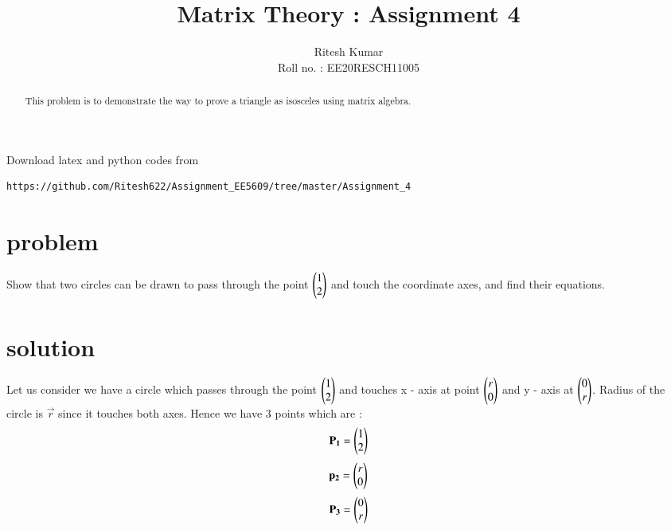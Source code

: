 \documentclass[journal,12pt,twocolumn]{IEEEtran}
\begin{document}
     \def\rightbox#1{\makebox[0in][r]{#1}}
     \def\centbox#1{\makebox[0in]{#1}}
     \def\topbox#1{\raisebox{-\baselineskip}[0in][0in]{#1}}
     \def\midbox#1{\raisebox{-0.5\baselineskip}[0in][0in]{#1}}
\vspace{3cm}
\title{ Matrix Theory : Assignment 4 }
\author{Ritesh Kumar \\ Roll no. : EE20RESCH11005 }
\maketitle
\newpage
\bigskip
\renewcommand{\thefigure}{\theenumi}
\renewcommand{\thetable}{\theenumi}
\begin{abstract}
This problem is to demonstrate the way to prove a triangle as isosceles using matrix algebra.
\end{abstract}
Download latex and python codes from 
\begin{lstlisting}
https://github.com/Ritesh622/Assignment_EE5609/tree/master/Assignment_4
\end{lstlisting}

\section{problem}
Show that two circles can be drawn to pass through the point
 $ \begin{pmatrix} 1 \\ 2 \\	\end{pmatrix} $  and touch the coordinate axes, and find their equations.


\section{solution}
Let us consider  we have a circle which passes through the point   $ \begin{pmatrix} 1 \\ 2 \\	\end{pmatrix} $  and touches  x - axis at point  $ \begin{pmatrix} r \\ 0 \\	\end{pmatrix} $ and y - axis  at $ \begin{pmatrix} 0 \\ r \\ \end{pmatrix} $. Radius of the circle is $\vec{r}$ since it touches both axes. Hence we have 3 points which are :
\begin{align}
\mathbf{P_{1}} = \begin{pmatrix} 1 \\ 2 \\\end{pmatrix}
\end{align}
\begin{align}
\mathbf{p_{2}} = \begin{pmatrix} r \\ 0 \\\end{pmatrix}
\end{align}
\begin{align}
\mathbf{P_{3}} = \begin{pmatrix} 0 \\ r \\\end{pmatrix}
\end{align}
\end{document}
